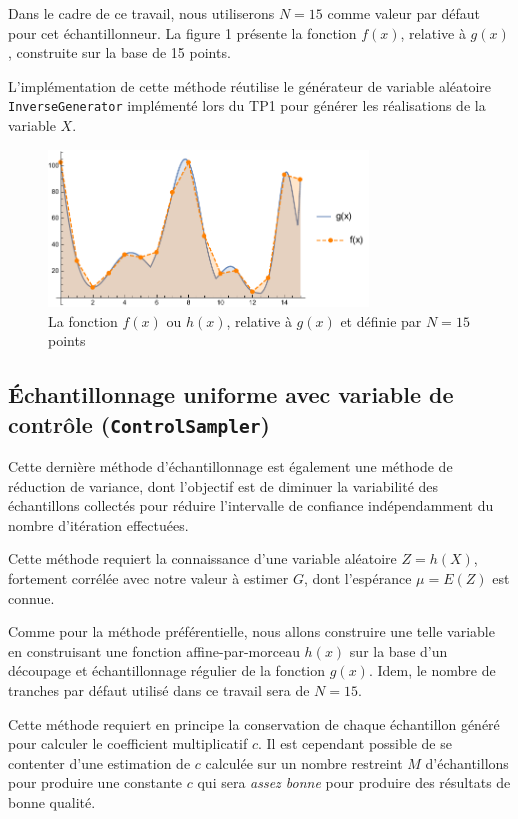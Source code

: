 \documentclass[a4paper,11pt]{article}
\begin{document}
Dans le cadre de ce travail, nous utiliserons $N = 15$ comme valeur par défaut pour cet échantillonneur. La figure 1 présente la fonction $f(x)$, relative à $g(x)$, construite sur la base de 15 points.

L'implémentation de cette méthode réutilise le générateur de variable aléatoire \texttt{InverseGenerator} implémenté lors du TP1 pour générer les réalisations de la variable $X$.

\begin{figure}[h]
	\begin{center}
		\includegraphics[width=8.5cm]{img_graph1}
	\end{center}
	\caption{La fonction $f(x)$ ou $h(x)$, relative à $g(x)$ et définie par $N=15$ points}
\end{figure}


\subsection{Échantillonnage uniforme avec variable de contrôle {\normalfont({\tt ControlSampler})}}

Cette dernière méthode d'échantillonnage est également une méthode de réduction de variance, dont l'objectif est de diminuer la variabilité des échantillons collectés pour réduire l'intervalle de confiance indépendamment du nombre d'itération effectuées.

Cette méthode requiert la connaissance d'une variable aléatoire $Z = h(X)$, fortement corrélée avec notre valeur à estimer $G$, dont l'espérance $\mu=E(Z)$ est connue.

Comme pour la méthode préférentielle, nous allons construire une telle variable en construisant une fonction affine-par-morceau $h(x)$ sur la base d'un découpage et échantillonnage régulier de la fonction $g(x)$. Idem, le nombre de tranches par défaut utilisé dans ce travail sera de $N=15$.

Cette méthode requiert en principe la conservation de chaque échantillon généré pour calculer le coefficient multiplicatif $c$. Il est cependant possible de se contenter d'une estimation de $c$ calculée sur un nombre restreint $M$ d'échantillons pour produire une constante $c$ qui sera \emph{assez bonne} pour produire des résultats de bonne qualité.
\end{document}
